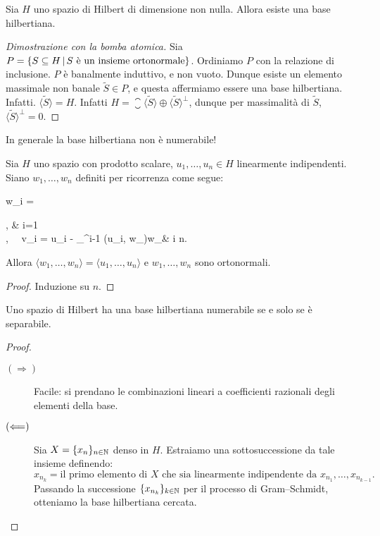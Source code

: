 \begin{theorem}
\label{th:hilb_basis}
	Sia $H$ uno spazio di Hilbert di dimensione non nulla.
	Allora esiste una base hilbertiana.
\end{theorem}
\begin{proof}[Dimostrazione con la bomba atomica]
	Sia $P = \{S \subseteq H \,|\, \text{$S$ è un insieme ortonormale} \}$. Ordiniamo $P$ con la relazione di inclusione. $P$ è banalmente induttivo, e non vuoto. Dunque esiste un elemento massimale non banale $\tilde S \in P$, e questa affermiamo essere una base hilbertiana. Infatti. $\langle \tilde S \rangle = H$. Infatti $H = \closure {\langle \tilde S \rangle} \oplus \langle \tilde S \rangle^\perp$, dunque per massimalità di $\tilde S$, $\langle \tilde S \rangle^\perp = 0$.
\end{proof}

\begin{remark}
	In generale la base hilbertiana non è numerabile!
\end{remark}

\begin{lemma}
	Sia $H$ uno spazio con prodotto scalare, $u_1, \ldots, u_n \in H$ linearmente indipendenti. Siano $w_1, \ldots, w_n$ definiti per ricorrenza come segue:
	\begin{eqalign*}
		w_i = \begin{dcases}
			, & i=1\\
			, \ \ v_i = u_i - \sum_{}^{i-1} (u_i, w_\ell)w_\ell & i  \leq n.
		\end{dcases}
	\end{eqalign*}
	Allora $\langle w_1, \ldots, w_n \rangle = \langle u_1, \ldots, u_n \rangle$ e $w_1, \ldots, w_n$ sono ortonormali.
\end{lemma}
\begin{proof}
	Induzione su $n$.
\end{proof}

\begin{theorem}
	Uno spazio di Hilbert ha una base hilbertiana numerabile se e solo se è separabile.
\end{theorem}
\begin{proof}
	\leavevmode
	\begin{description}
		\item[$(\Longrightarrow)$] Facile: si prendano le combinazioni lineari a coefficienti razionali degli elementi della base.
		\item[$(\Longleftarrow)$] Sia $X=\{x_n\}_{n \in \mathbb{N}}$ denso in $H$. Estraiamo una sottosuccessione da tale insieme definendo:
		\begin{equation*}
			x_{n_k} = \text{il primo elemento di $X$ che sia linearmente indipendente da $x_{n_1}, \ldots, x_{n_{k-1}}$}.
		\end{equation*}
		Passando la successione $\{x_{n_k}\}_{k \in \mathbb{N}}$ per il processo di Gram--Schmidt, otteniamo la base hilbertiana cercata.
	\end{description}
\end{proof}

